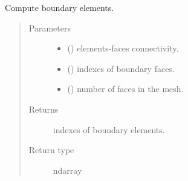 \documentclass[letterpaper,10pt,english]{sphinxmanual}
\begin{document}
\begin{fulllineitems}
\label{\detokenize{petgem/mesh:petgem.mesh.computeBoundaryElements}}
Compute boundary elements.
\begin{quote}\begin{description}
\item[{Parameters}] \leavevmode\begin{itemize}
\item {} 
 () \textendash{} elements-faces connectivity.

\item {} 
 () \textendash{} indexes of boundary faces.

\item {} 
 () \textendash{} number of faces in the mesh.

\end{itemize}

\item[{Returns}] \leavevmode
indexes of boundary elements.

\item[{Return type}] \leavevmode
ndarray

\end{description}\end{quote}

\end{fulllineitems}

\end{document}
